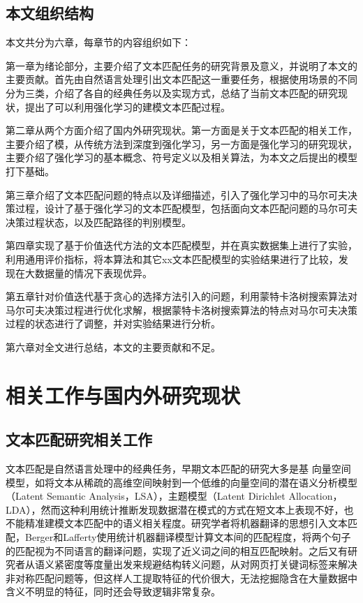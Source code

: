 \section{本文组织结构}
本文共分为六章，每章节的内容组织如下：

第一章为绪论部分，主要介绍了文本匹配任务的研究背景及意义，并说明了本文的主要贡献。首先由自然语言处理引出文本匹配这一重要任务，根据使用场景的不同分为三类，介绍了各自的经典任务以及实现方式，总结了当前文本匹配的研究现状，提出了可以利用强化学习的建模文本匹配过程。

第二章从两个方面介绍了国内外研究现状。第一方面是关于文本匹配的相关工作，主要介绍了模，从传统方法到深度到强化学习，另一方面是强化学习的研究现状，主要介绍了强化学习的基本概念、符号定义以及相关算法，为本文之后提出的模型打下基础。

第三章介绍了文本匹配问题的特点以及详细描述，引入了强化学习中的马尔可夫决策过程，设计了基于强化学习的文本匹配模型，包括面向文本匹配问题的马尔可夫决策过程状态，以及匹配路径的判别模型。

第四章实现了基于价值迭代方法的文本匹配模型，并在真实数据集上进行了实验，利用通用评价指标，将本算法和其它xx文本匹配模型的实验结果进行了比较，发现在大数据量的情况下表现优异。

第五章针对价值迭代基于贪心的选择方法引入的问题，利用蒙特卡洛树搜索算法对马尔可夫决策过程进行优化求解，根据蒙特卡洛树搜索算法的特点对马尔可夫决策过程的状态进行了调整，并对实验结果进行分析。

第六章对全文进行总结，本文的主要贡献和不足。



\chapter{相关工作与国内外研究现状}

\section{文本匹配研究相关工作}
\label{sec:text_matching}
文本匹配是自然语言处理中的经典任务，早期文本匹配的研究大多是基 向量空间模型，如将文本从稀疏的高维空间映射到一个低维的向量空间的潜在语义分析模型\cite{Landauer1998AnIT}（Latent Semantic Analysis，LSA），主题模型\cite{Blei2003LatentDA}（Latent Dirichlet Allocation，LDA），然而这种利用统计推断发现数据潜在模式的方式在短文本上表现不好，也不能精准建模文本匹配中的语义相关程度。研究学者将机器翻译的思想引入文本匹配，Berger和Lafferty使用统计机器翻译模型计算文本间的匹配程度，将两个句子的匹配视为不同语言的翻译问题，实现了近义词之间的相互匹配映射。之后又有研究者从语义紧密度等度量出发来规避结构转义问题，从对网页打关键词标签来解决非对称匹配问题等，但这样人工提取特征的代价很大，无法挖掘隐含在大量数据中含义不明显的特征，同时还会导致逻辑非常复杂。

